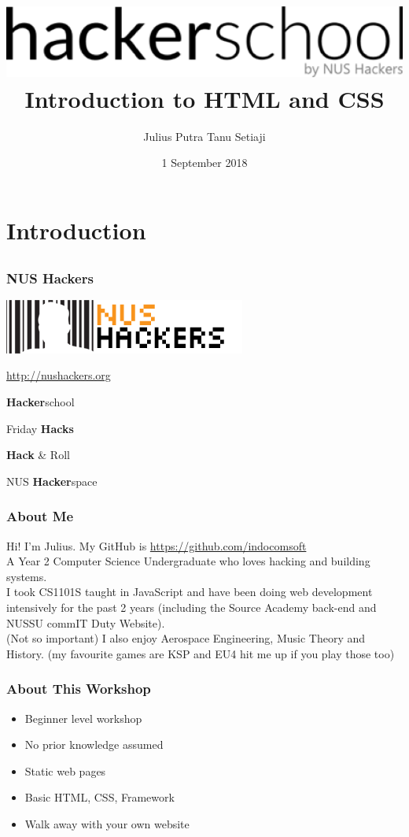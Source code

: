 \documentclass[12pt]{beamer}
\title{ \includegraphics[width=0.5\linewidth]{hackerschool} \\ Introduction to HTML and CSS}
\author{Julius Putra Tanu Setiaji}
\date{1 September 2018}
\begin{document}
\frame{\titlepage}

\section{Introduction}
\subsection{}

\begin{frame}
\frametitle{NUS Hackers}

\begin{center}	
\includegraphics[width=0.5\linewidth]{NUSHackers}

\url{http://nushackers.org}
\end{center}

\begin{center}
	\textbf{Hacker}school
	
	Friday \textbf{Hacks}
	
	\textbf{Hack} \& Roll
	
	NUS \textbf{Hacker}space
\end{center}

\end{frame}

\begin{frame}
\frametitle{About Me}
Hi! I'm Julius. My GitHub is \url{https://github.com/indocomsoft}\\

A Year 2 Computer Science Undergraduate who loves hacking and building systems.\\

I took CS1101S taught in JavaScript and have been doing web development intensively for the past 2 years (including the Source Academy back-end and NUSSU commIT Duty Website).\\

(Not so important) I also enjoy Aerospace Engineering, Music Theory and History. {\tiny (my favourite games are KSP and EU4 hit me up if you play those too)}
\end{frame}

\begin{frame}
\frametitle{About This Workshop}
\begin{itemize}
	\item Beginner level workshop
	\item No prior knowledge assumed
	\item Static web pages
	\item Basic HTML, CSS, Framework
	\item Walk away with your own website
\end{itemize}
\end{frame}
\end{document}
